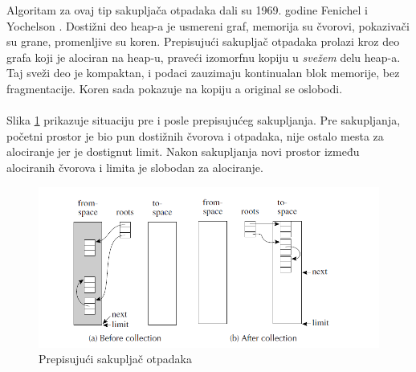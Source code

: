 Algoritam za ovaj tip sakupljača otpadaka dali su 1969. godine Fenichel i
Yochelson \cite{feni69}.
Dostižni deo heap-a je usmereni graf, memorija su čvorovi, pokazivači su grane, promenljive su koren.
Prepisujući sakupljač otpadaka prolazi kroz deo grafa koji je alociran na heap-u, praveći izomorfnu kopiju u \textit{svežem} delu heap-a.
Taj sveži deo je kompaktan, i podaci zauzimaju kontinualan blok memorije, bez fragmentacije.
Koren sada pokazuje na kopiju a original se oslobodi.
\\
\\
Slika \ref{fig:copygc} prikazuje situaciju pre i posle prepisujućeg sakupljanja.
Pre sakupljanja, početni prostor je bio pun dostižnih čvorova i otpadaka, nije ostalo mesta za alociranje jer je dostignut limit.
Nakon sakupljanja novi prostor između alociranih čvorova i limita je slobodan za alociranje.

\begin{figure}[h!]
\begin{center}
\includegraphics[scale=0.55]{copygc.png}
\end{center}
\caption{Prepisujući sakupljač otpadaka}
\label{fig:copygc}
\end{figure}

